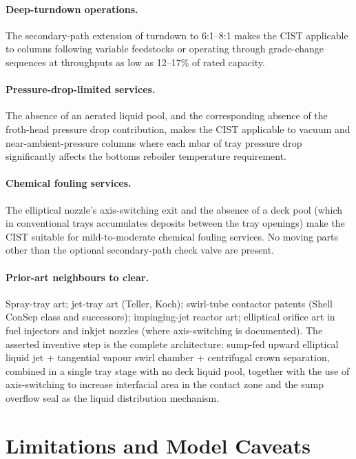 \documentclass[11pt,letterpaper]{article}
\begin{document}
\paragraph{Deep-turndown operations.}
The secondary-path extension of turndown to 6:1--8:1 makes the CIST
applicable to columns following variable feedstocks or operating through
grade-change sequences at throughputs as low as 12--17\% of rated
capacity.

\paragraph{Pressure-drop-limited services.}
The absence of an aerated liquid pool, and the corresponding absence of
the froth-head pressure drop contribution, makes the CIST applicable to
vacuum and near-ambient-pressure columns where each mbar of tray pressure
drop significantly affects the bottoms reboiler temperature requirement.

\paragraph{Chemical fouling services.}
The elliptical nozzle's axis-switching exit and the absence of a deck pool
(which in conventional trays accumulates deposits between the tray openings)
make the CIST suitable for mild-to-moderate chemical fouling services.
No moving parts other than the optional secondary-path check valve are
present.

\paragraph{Prior-art neighbours to clear.}
Spray-tray art; jet-tray art (Teller, Koch); swirl-tube contactor patents
(Shell ConSep class and successors); impinging-jet reactor art; elliptical
orifice art in fuel injectors and inkjet nozzles (where axis-switching is
documented).  The asserted inventive step is the complete architecture:
sump-fed upward elliptical liquid jet + tangential vapour swirl chamber +
centrifugal crown separation, combined in a single tray stage with no deck
liquid pool, together with the use of axis-switching to increase interfacial
area in the contact zone and the sump overflow seal as the liquid
distribution mechanism.

\section{Limitations and Model Caveats}
\label{sec:limitations}
\end{document}
